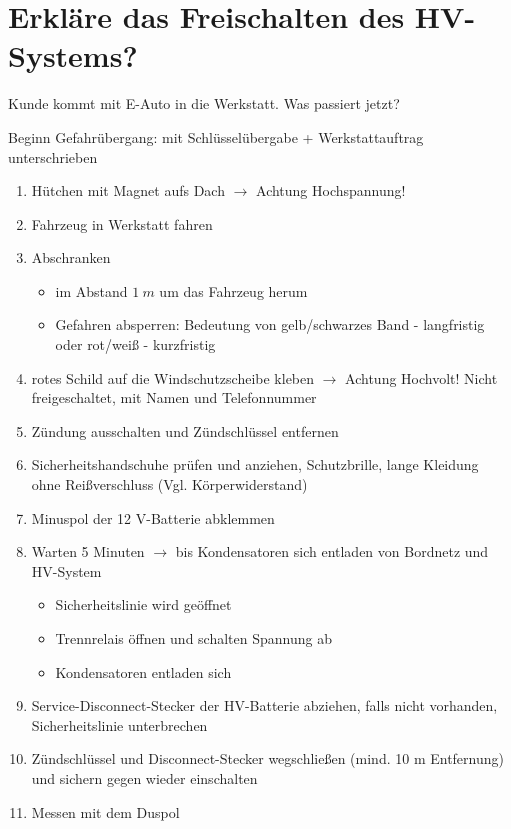 \section{Erkläre das Freischalten des
HV-Systems?}\label{erklaere-das-freischalten-des-hv-systems}

Kunde kommt mit E-Auto in die Werkstatt. Was passiert jetzt?

Beginn Gefahrübergang: mit Schlüsselübergabe + Werkstattauftrag
unterschrieben

\begin{enumerate}
\item
  Hütchen mit Magnet aufs Dach $\to$ Achtung Hochspannung!
\item
  Fahrzeug in Werkstatt fahren
\item
  Abschranken

  \begin{itemize}
  \item
    im Abstand $1~m$ um das Fahrzeug herum
  \item
    Gefahren absperren: Bedeutung von gelb/schwarzes Band - langfristig
    oder rot/weiß - kurzfristig
  \end{itemize}
\item
  rotes Schild auf die Windschutzscheibe kleben $\to$ Achtung
  Hochvolt! Nicht freigeschaltet, mit Namen und Telefonnummer
\item
  Zündung ausschalten und Zündschlüssel entfernen
\item
  Sicherheitshandschuhe prüfen und anziehen, Schutzbrille, lange
  Kleidung ohne Reißverschluss (Vgl. Körperwiderstand)
\item
  Minuspol der 12 V-Batterie abklemmen
\item
  Warten 5 Minuten $\to$ bis Kondensatoren sich entladen von Bordnetz
  und HV-System

  \begin{itemize}
  \item
    Sicherheitslinie wird geöffnet
  \item
    Trennrelais öffnen und schalten Spannung ab
  \item
    Kondensatoren entladen sich
  \end{itemize}
\item
  Service-Disconnect-Stecker der HV-Batterie abziehen, falls nicht
  vorhanden, Sicherheitslinie unterbrechen
\item
  Zündschlüssel und Disconnect-Stecker wegschließen (mind. 10 m
  Entfernung) und sichern gegen wieder einschalten
\item
  Messen mit dem Duspol


\end{enumerate}
